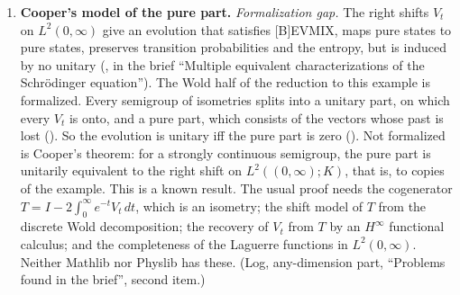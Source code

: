 \documentclass[11pt]{article}
\begin{document}
\begin{enumerate}
  propagator is not built there. (Log, ``The equation at every time''.)
\item \textbf{Cooper's model of the pure part.} \emph{Formalization gap.} The right shifts $V_t$ on $L^2(0,\infty)$ give an
  evolution that satisfies [B]EVMIX, maps pure states to pure states, preserves transition
  probabilities and the entropy, but is induced by no unitary
  (, in the brief ``Multiple equivalent characterizations of
  the Schr\"odinger equation''). The Wold half of the reduction to this example is formalized.
  Every semigroup of isometries splits into a unitary part, on which every $V_t$ is onto, and a
  pure part, which consists of the vectors whose past is lost
  (). So the evolution is unitary iff the
  pure part is zero (). Not formalized is Cooper's
  theorem: for a strongly continuous semigroup, the pure part is unitarily equivalent to the
  right shift on $L^2((0,\infty);K)$, that is, to copies of the example. This is a known result.
  The usual proof needs the cogenerator $T = I - 2\int_0^\infty e^{-t}V_t\,dt$, which is an
  isometry; the shift model of $T$ from the discrete Wold decomposition; the recovery of $V_t$
  from $T$ by an $H^\infty$ functional calculus; and the completeness of the Laguerre functions in
  $L^2(0,\infty)$. Neither Mathlib nor Physlib has these. (Log, any-dimension part, ``Problems
  found in the brief'', second item.)
\end{enumerate}
\end{document}
